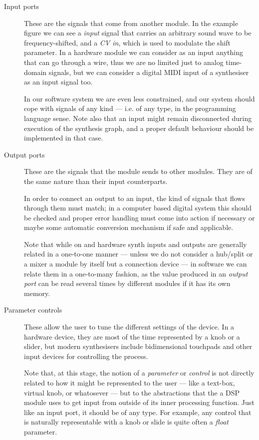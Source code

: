 \begin{description}
\item[Input ports] These are the signals that come from another module. In
  the example figure we can see a \emph{input} signal that carries an
  arbitrary sound wave to be frequency-shifted, and a \emph{CV in},
  which is used to modulate the shift parameter. In a hardware module
  we can consider as an input anything that can go through a wire,
  thus we are no limited just to analog time-domain signals, but we
  can consider a digital MIDI input of a synthesiser as an input
  signal too.

  In our software system we are even less constrained, and our system
  should cope with signals of any kind --- i.e. of any type, in the
  programming language sense. Note also that an input might remain
  disconnected during execution of the synthesis graph, and a proper
  default behaviour should be implemented in that case.

\item[Output ports] These are the signals that the module sends to other
  modules. They are of the same nature than their input counterparts.

  In order to connect an output to an input, the kind of signals that
  flows through them must match; in a computer based digital system
  this should be checked and proper error handling must come into
  action if necessary or maybe some automatic conversion mechanism if
  safe and applicable.

  Note that while on and hardware synth inputs and outputs are
  generally related in a one-to-one manner --- unless we do not
  consider a hub/split or a mixer a module by itself but a connection
  device --- in software we can relate them in a one-to-many fashion,
  as the value produced in an \emph{output port} can be read several
  times by different modules if it has its own memory.

\item[Parameter controls] These allow the user to tune the different
  settings of the device. In a hardware device, they are most of the
  time represented by a knob or a slider, but modern synthesisers
  include bidimensional touchpads and other input devices for
  controlling the process.

  Note that, at this stage, the notion of a \emph{parameter} or
  \emph{control} is not directly related to how it might be
  represented to the user --- like a text-box, virtual knob, or
  whatosever --- but to the abstractions that the a DSP module uses to
  get input from outside of its inner processing function. Just like
  an input port, it should be of any type. For example, any control
  that is naturally representable with a knob or slide is quite often
  a \emph{float} parameter.


\end{description}
